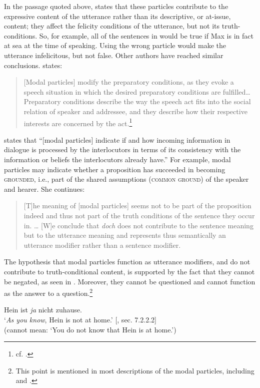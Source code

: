 In the passage quoted above, \citet{Zimmermann2011} states that these particles contribute to the expressive content of the utterance rather than its descriptive, or at-issue, content; they affect the felicity conditions of the utterance, but not its truth-conditions. So, for example, all of the sentences in  would be true if Max is in fact at sea at the time of speaking. Using the wrong particle would make the utterance infelicitous, but not false. Other authors have reached similar conclusions. \citet{Waltereit2001} states:


\begin{quote}
{}[Modal particles] modify the preparatory conditions, as they evoke a speech situation in which the desired preparatory conditions are fulfilled… Preparatory conditions describe the way the speech act fits into the social relation of speaker and addressee, and they describe how their respective interests are concerned by the act.\footnote{cf. \citet{Searle1969}.}
\end{quote}


\citet{Karagjosova2000} states that “[modal particles] indicate if and how incoming information in dialogue is processed by the interlocutors in terms of its consistency with the information or beliefs the interlocutors already have.” For example, modal particles may indicate whether a proposition has succeeded in becoming \textsc{grounded}, i.e., part of the shared assumptions (\textsc{common ground}) of the speaker and hearer. She continues:


\begin{quote}
{}[T]he meaning of [modal particles] seems not to be part of the proposition indeed and thus not part of the truth conditions of the sentence they occur in. …  [W]e conclude that \textit{doch} does not contribute to the sentence meaning but to the utterance meaning and represents thus semantically an utterance modifier rather than a sentence modifier.
\end{quote}


The hypothesis that  modal particles function as utterance modifiers, and do not contribute to truth-conditional content, is supported by the fact that they cannot be negated, as seen in . Moreover, they cannot be questioned and cannot function as the answer to a question.\footnote{This point is mentioned in most descriptions of the  modal particles, including \citet{Bross2012} and \citet{Gutzmann2015}.}


\ea \label{ex:11.28}
Hein ist \textit{ja} nicht zuhause.\\
\glt ‘\textit{As you know}, Hein is not at home.’  [\citealt{Gutzmann2015}, sec. 7.2.2.2]\\
(cannot mean: ‘You do not know that Hein is at home.’)
\z

